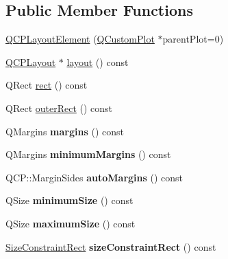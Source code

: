 \subsection*{Public Member Functions}
\begin{DoxyCompactItemize}
\item 
\hyperlink{classQCPLayoutElement_a8947f0ada17e672aaba3d424cbbb67e3}{Q\+C\+P\+Layout\+Element} (\hyperlink{classQCustomPlot}{Q\+Custom\+Plot} $\ast$parent\+Plot=0)
\item 
\hyperlink{classQCPLayout}{Q\+C\+P\+Layout} $\ast$ \hyperlink{classQCPLayoutElement_a4efdcbde9d28f410e5ef166c9d691deb}{layout} () const
\item 
Q\+Rect \hyperlink{classQCPLayoutElement_a208effccfe2cca4a0eaf9393e60f2dd4}{rect} () const
\item 
Q\+Rect \hyperlink{classQCPLayoutElement_a2a32a12a6161c9dffbadeb9cc585510c}{outer\+Rect} () const
\item 
\mbox{\label{classQCPLayoutElement_af4ac9450aa2d60863bf3a8ea0c940c9d}} 
Q\+Margins {\bfseries margins} () const
\item 
\mbox{\label{classQCPLayoutElement_a5eae30e28f28d73fd1c56409c011393e}} 
Q\+Margins {\bfseries minimum\+Margins} () const
\item 
\mbox{\label{classQCPLayoutElement_a2585bc8c5cc70ee712909751a2fc8909}} 
Q\+C\+P\+::\+Margin\+Sides {\bfseries auto\+Margins} () const
\item 
\mbox{\label{classQCPLayoutElement_a60d4295468a2b57fe91f6f68e20c3993}} 
Q\+Size {\bfseries minimum\+Size} () const
\item 
\mbox{\label{classQCPLayoutElement_afb9503858d4aa0f3b9f1794b084fb40a}} 
Q\+Size {\bfseries maximum\+Size} () const
\item 
\mbox{\label{classQCPLayoutElement_a66136f121ee3e1c933b748761203cab4}} 
\hyperlink{classQCPLayoutElement_a0afb3e5773529e4bd20e448f81be4d2a}{Size\+Constraint\+Rect} {\bfseries size\+Constraint\+Rect} () const
\item 
\mbox{\label{classQCPLayoutElement_a8af6bcf81e12fe1d6f44490f34522b90}} 

\end{DoxyCompactItemize}
